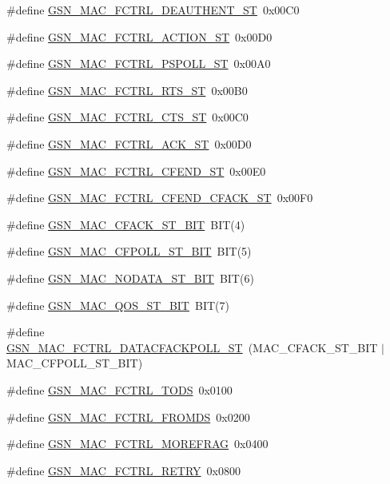 \begin{DoxyCompactItemize}
\#define \hyperlink{a00523_ae2d5c0cc41f04eaa623ec4c433fda069}{GSN\_\-MAC\_\-FCTRL\_\-DEAUTHENT\_\-ST}~0x00C0
\item 
\#define \hyperlink{a00523_ac9cd37e66f3584a23910fab2e4a74227}{GSN\_\-MAC\_\-FCTRL\_\-ACTION\_\-ST}~0x00D0
\item 
\#define \hyperlink{a00523_ae1552ca3079dcc2ff62551f8fd83b6c7}{GSN\_\-MAC\_\-FCTRL\_\-PSPOLL\_\-ST}~0x00A0
\item 
\#define \hyperlink{a00523_a834605e143a337b19f610c8c8995679c}{GSN\_\-MAC\_\-FCTRL\_\-RTS\_\-ST}~0x00B0
\item 
\#define \hyperlink{a00523_ac3a5c9c88e69c3f2b076bb89504f7c55}{GSN\_\-MAC\_\-FCTRL\_\-CTS\_\-ST}~0x00C0
\item 
\#define \hyperlink{a00523_a4626cd7bd8a42a2e7eb53ae7175108af}{GSN\_\-MAC\_\-FCTRL\_\-ACK\_\-ST}~0x00D0
\item 
\#define \hyperlink{a00523_ada0401d2fcecac8045f747158a1c19c1}{GSN\_\-MAC\_\-FCTRL\_\-CFEND\_\-ST}~0x00E0
\item 
\#define \hyperlink{a00523_a51d3bbb0291d2702705582f0a62aa47f}{GSN\_\-MAC\_\-FCTRL\_\-CFEND\_\-CFACK\_\-ST}~0x00F0
\item 
\#define \hyperlink{a00523_a9d7b1fb963148277b675a34a5665b056}{GSN\_\-MAC\_\-CFACK\_\-ST\_\-BIT}~BIT(4)
\item 
\#define \hyperlink{a00523_af8bfdb80251044fe896147ff5f8d9e66}{GSN\_\-MAC\_\-CFPOLL\_\-ST\_\-BIT}~BIT(5)
\item 
\#define \hyperlink{a00523_ab8865bbea13c1a7978979d1c2fbbbc88}{GSN\_\-MAC\_\-NODATA\_\-ST\_\-BIT}~BIT(6)
\item 
\#define \hyperlink{a00523_a523e458cbc29e70edf1bd06795ee2920}{GSN\_\-MAC\_\-QOS\_\-ST\_\-BIT}~BIT(7)
\item 
\#define \hyperlink{a00523_a6b41426965f1ca3d3537cb0f391e1aac}{GSN\_\-MAC\_\-FCTRL\_\-DATACFACKPOLL\_\-ST}~(MAC\_\-CFACK\_\-ST\_\-BIT $|$ MAC\_\-CFPOLL\_\-ST\_\-BIT)
\item 
\#define \hyperlink{a00523_a582ea450f88453cf5a4837c2c0a2f2fa}{GSN\_\-MAC\_\-FCTRL\_\-TODS}~0x0100
\item 
\#define \hyperlink{a00523_a4af07976ca04f0c0ea1250f56bfc5189}{GSN\_\-MAC\_\-FCTRL\_\-FROMDS}~0x0200
\item 
\#define \hyperlink{a00523_aee929bb445c92201ad1bbd53a9a730bf}{GSN\_\-MAC\_\-FCTRL\_\-MOREFRAG}~0x0400
\item 
\#define \hyperlink{a00523_a9fc182abd66e27f6a095fbfdfe5635e8}{GSN\_\-MAC\_\-FCTRL\_\-RETRY}~0x0800
\item 

\end{DoxyCompactItemize}
